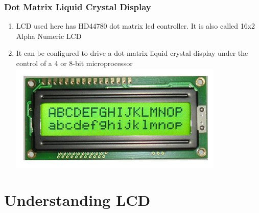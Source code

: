 \documentclass[10pt,red]{beamer}
\begin{document}
\begin{frame}
	\frametitle{Dot Matrix Liquid Crystal Display} \pause
	\begin{enumerate}
	\item<+-|alert@+> LCD used here has HD44780 dot matrix lcd controller. It is also called 16x2 Alpha Numeric LCD \\[10pt]
	\item<+-|alert@+> It can be configured to drive a dot-matrix liquid crystal display under the control of a 4 or 8-bit	microprocessor \\[15pt]
	\includegraphics[width=0.8\linewidth]{lcd_display}
	\end{enumerate}
\end{frame}

\section{Understanding LCD}
\end{document}
